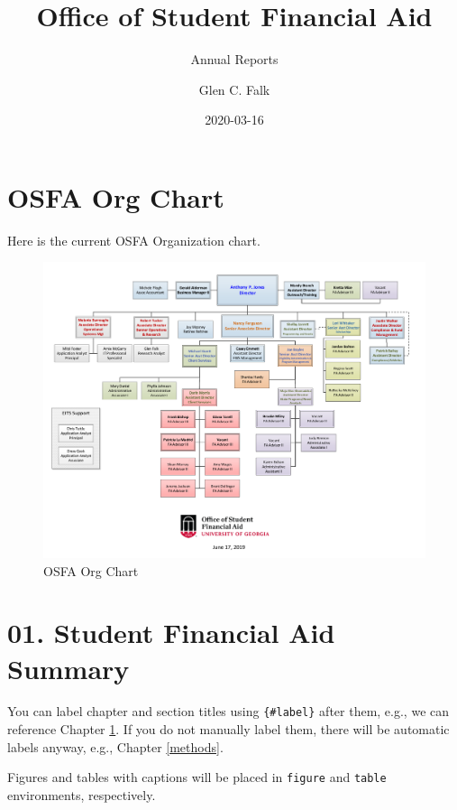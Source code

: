 \documentclass[
]{book}
\title{Office of Student Financial Aid}
\subtitle{Annual Reports}
\author{Glen C. Falk}
\date{2020-03-16}
\begin{document}
\maketitle

{
\setcounter{tocdepth}{1}
\tableofcontents
}
\hypertarget{osfa-org-chart}{%
\chapter*{OSFA Org Chart}\label{osfa-org-chart}}

Here is the current OSFA Organization chart.

\begin{figure}

{\centering \includegraphics[width=1\linewidth]{images/OSFAOrgChart} 

}

\caption{OSFA Org Chart}\label{fig:label}
\end{figure}

\hypertarget{intro}{%
\chapter{01. Student Financial Aid Summary}\label{intro}}

You can label chapter and section titles using \texttt{\{\#label\}} after them, e.g., we can reference Chapter \ref{intro}. If you do not manually label them, there will be automatic labels anyway, e.g., Chapter \ref{methods}.

Figures and tables with captions will be placed in \texttt{figure} and \texttt{table} environments, respectively.
\end{document}
